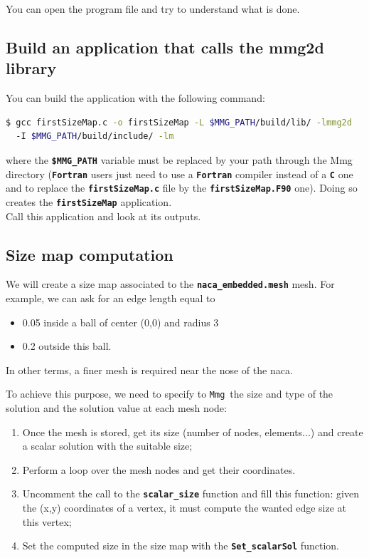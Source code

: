 \documentclass{article}
\newcommand{\ttb}[1]{\texttt{\textbf{#1}}}
\newcommand{\mmg}{\texttt{Mmg}}
\begin{document}
You can open the program file and try to understand what is done.

\subsection{Build an application that calls the mmg2d library}
You can build the application with the following command:
\begin{lstlisting}[language=bash]
$ gcc firstSizeMap.c -o firstSizeMap -L $MMG_PATH/build/lib/ -lmmg2d
  -I $MMG_PATH/build/include/ -lm
\end{lstlisting}
where the \ttb{\$MMG\_PATH} variable must be replaced by your path
through the Mmg directory (\ttb{Fortran} users just need to use a \ttb{Fortran} compiler
instead of a \ttb{C} one and to replace the \ttb{firstSizeMap.c} file by the
\ttb{firstSizeMap.F90} one). Doing so creates the \ttb{firstSizeMap} application.\\

Call this application and look at its outputs.

\subsection{Size map computation}

We will create a size map associated to the \ttb{naca\_embedded.mesh} mesh.
For example, we can ask for an edge length equal to 
\begin{itemize}
\item 0.05 inside a
ball of center (0,0) and radius 3 
\item 0.2 outside this ball.
\end{itemize}
In other terms, a finer mesh is required near the nose of the naca. 

To achieve this purpose, we need to
specify to \mmg\ the size and type of the solution and
the solution value at each mesh node:
\begin{enumerate}
\item Once the mesh is stored, get its size (number of nodes,
  elements...) and create a scalar solution with the suitable size;
\item Perform a loop over the mesh nodes and get their coordinates.
\item Uncomment the call to the \ttb{scalar\_size} function and fill
  this function: given the (x,y) coordinates of a vertex, it must
  compute the wanted edge size at this vertex;
\item Set the computed size in the size map with the \ttb{Set\_scalarSol} function.\\
\end{enumerate}
\end{document}
